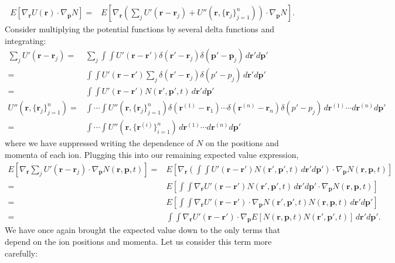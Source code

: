 \documentclass{article}
\begin{document}
\begin{align*}
E\left[\nabla_\mathbf{r} U(\mathbf{r})\cdot\nabla_\mathbf{p}N\right]=&E\left[\nabla_\mathbf{r} \left(\sum_{j}U'(\mathbf{r}-\mathbf{r}_j)+U''\left(\mathbf{r},\{\mathbf{r}_j\}_{j=1}^n\right)\right)\cdot \nabla_\mathbf{p} N\right].
\end{align*}Consider multiplying the potential functions by several delta functions and integrating:
\begin{align*}
\sum_j U'(\mathbf{r}-\mathbf{r}_j)=&\sum_j\int\int U'(\mathbf{r}-\mathbf{r}')\delta(\mathbf{r}'-\mathbf{r}_j)\delta(\mathbf{p}'-\mathbf{p}_j)\,d\mathbf{r}'d\mathbf{p}'\\
=&\int\int U'(\mathbf{r}-\mathbf{r}')\sum_j\delta(\mathbf{r}'-\mathbf{r}_j)\delta(p'-p_j)\,d\mathbf{r}'d\mathbf{p}'\\
=&\int\int U'(\mathbf{r}-\mathbf{r}')N(\mathbf{r}',\mathbf{p}',t)\,d\mathbf{r}'d\mathbf{p}'\\
U''\left(\mathbf{r},\{\mathbf{r}_j\}_{j=1}^n\right)=&\int\cdots\int U''\left(\mathbf{r},\{\mathbf{r}_j\}_{j=1}^n\right)\delta(\mathbf{r}^{(1)}-\mathbf{r}_1)\cdots\delta(\mathbf{r}^{(n)}-\mathbf{r}_n)\delta(p'-p_j)\,d\mathbf{r}^{(1)}\cdots d\mathbf{r}^{(n)}d\mathbf{p}'\\
=&\int\cdots\int U''\left(\mathbf{r},\{\mathbf{r}^{(i)}\}_{i=1}^n\right)\,d\mathbf{r}^{(1)}\cdots d\mathbf{r}^{(n)}d\mathbf{p}'
\end{align*}where we have suppressed writing the dependence of $N$ on the positions and momenta of each ion. Plugging this into our remaining expected value expression,
\begin{align*}
E\left[\nabla_\mathbf{r}\sum_jU'(\mathbf{r}-\mathbf{r}_j)\cdot \nabla_\mathbf{p}N(\mathbf{r},\mathbf{p},t)\right]=&E\left[\nabla_\mathbf{r}\left(\int\int U'(\mathbf{r}-\mathbf{r}')N(\mathbf{r}',\mathbf{p}',t)\,d\mathbf{r}'d\mathbf{p}'\right)\cdot\nabla_\mathbf{p}N(\mathbf{r},\mathbf{p},t)\right]\\
=&E\left[\int\int\nabla_\mathbf{r}U'(\mathbf{r}-\mathbf{r}')N(\mathbf{r}',\mathbf{p}',t)\,d\mathbf{r}'d\mathbf{p}'\cdot\nabla_\mathbf{p}N(\mathbf{r},\mathbf{p},t)\right]\\
=&E\left[\int\int\nabla_\mathbf{r}U'(\mathbf{r}-\mathbf{r}')\cdot\nabla_\mathbf{p} N(\mathbf{r}',\mathbf{p}',t)N(\mathbf{r},\mathbf{p},t)\,d\mathbf{r}'d\mathbf{p}'\right]\\
=&\int\int\nabla_\mathbf{r}U'(\mathbf{r}-\mathbf{r}')\cdot\nabla_\mathbf{p}E\left[N(\mathbf{r},\mathbf{p},t)N(\mathbf{r}',\mathbf{p}',t)\right]\,d\mathbf{r}'d\mathbf{p}'.
\end{align*}We have once again brought the expected value down to the only terms that depend on the ion positions and momenta. Let us consider this term more carefully:
\end{document}
